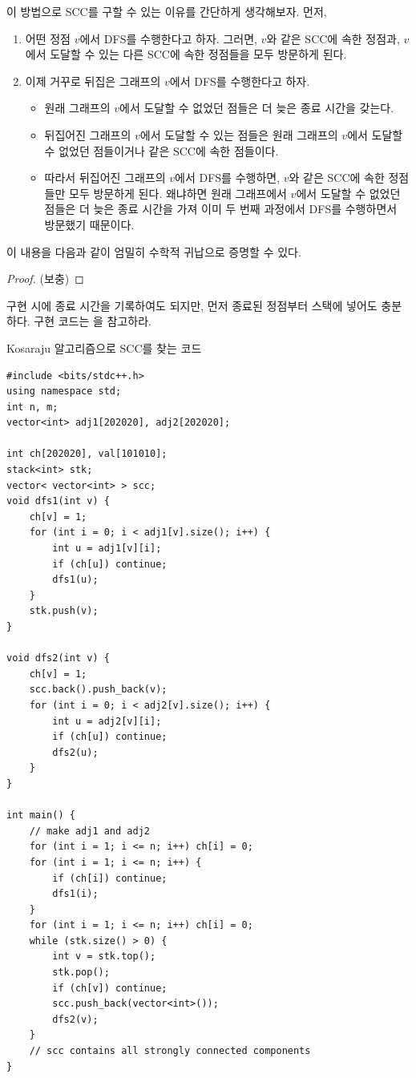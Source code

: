 이 방법으로 SCC를 구할 수 있는 이유를 간단하게 생각해보자. 먼저,
\begin{enumerate}
    \item 어떤 정점 $v$에서 DFS를 수행한다고 하자. 그러면, $v$와 같은 SCC에 속한 정점과, $v$에서 도달할 수 있는 다른 SCC에 속한 정점들을 모두 방문하게 된다.
    \item 이제 거꾸로 뒤집은 그래프의 $v$에서 DFS를 수행한다고 하자.
    \begin{itemize}
        \item 원래 그래프의 $v$에서 도달할 수 없었던 점들은 더 늦은 종료 시간을 갖는다.
        \item 뒤집어진 그래프의 $v$에서 도달할 수 있는 점들은 원래 그래프의 $v$에서 도달할 수 없었던 점들이거나 같은 SCC에 속한 점들이다.
        \item 따라서 뒤집어진 그래프의 $v$에서 DFS를 수행하면, $v$와 같은 SCC에 속한 정점들만 모두 방문하게 된다. 왜냐하면 원래 그래프에서 $v$에서 도달할 수 없었던 점들은 더 늦은 종료 시간을 가져 이미 두 번째 과정에서 DFS를 수행하면서 방문했기 때문이다.
    \end{itemize}
\end{enumerate}

이 내용을 다음과 같이 엄밀히 수학적 귀납으로 증명할 수 있다.
\begin{proof}
    (보충)
\end{proof}

구현 시에 종료 시간을 기록하여도 되지만, 먼저 종료된 정점부터 스택에 넣어도 충분하다. 구현 코드는 을 참고하라.

\begin{code} \label{code: Kosaraju}
Kosaraju 알고리즘으로 SCC를 찾는 코드
\begin{lstlisting}
#include <bits/stdc++.h>
using namespace std;
int n, m;
vector<int> adj1[202020], adj2[202020];

int ch[202020], val[101010];
stack<int> stk;
vector< vector<int> > scc;
void dfs1(int v) {
    ch[v] = 1;
    for (int i = 0; i < adj1[v].size(); i++) {
        int u = adj1[v][i];
        if (ch[u]) continue;
        dfs1(u);
    }
    stk.push(v);
}

void dfs2(int v) {
    ch[v] = 1;
    scc.back().push_back(v);
    for (int i = 0; i < adj2[v].size(); i++) {
        int u = adj2[v][i];
        if (ch[u]) continue;
        dfs2(u);
    }
}

int main() {
    // make adj1 and adj2
    for (int i = 1; i <= n; i++) ch[i] = 0;
    for (int i = 1; i <= n; i++) {
        if (ch[i]) continue;
        dfs1(i);
    }
    for (int i = 1; i <= n; i++) ch[i] = 0;
    while (stk.size() > 0) {
        int v = stk.top();
        stk.pop();
        if (ch[v]) continue;
        scc.push_back(vector<int>());
        dfs2(v);
    }
    // scc contains all strongly connected components
}
\end{lstlisting}
\end{code}

